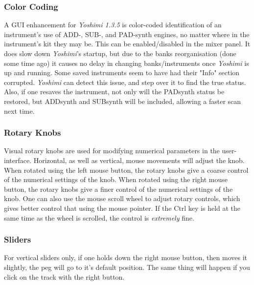 \subsubsection{Color Coding}
\label{subsubsec:stock_settings_elements_color_coding}

   A GUI enhancement for \textsl{Yoshimi 1.3.5} is color-coded identification
   of an instrument's use of ADD-, SUB-, and PAD-synth engines, no matter where
   in the instrument's kit they may be. This can be enabled/disabled in the
   mixer panel. It does slow down \textsl{Yoshimi}'s startup, but due to the
   banks reorganisation (done some time ago) it causes no delay in changing
   banks/instruments once \textsl{Yoshimi} is up and running.  Some saved
   instruments seem to have had their "Info" section corrupted.
   \textsl{Yoshimi} can detect this issue, and step over it to find the true
   status. Also, if one resaves the instrument, not only will the PADsynth
   status be restored, but ADDsynth and SUBsynth will be included, allowing a
   faster scan next time.

\subsubsection{Rotary Knobs}
\label{subsubsec:stock_settings_elements_knobs}

   Visual rotary knobs are used for modifying numerical parameters in the
   user-interface.
   Horizontal, as well as vertical, mouse movements will adjust the knob.
   When rotated using the left mouse button, the rotary knobs give a coarse
   control of the numerical settings of the knob.
   When rotated using the right mouse button, the rotary knobs give a finer
   control of the numerical settings of the knob.
   One can also use the mouse scroll wheel to adjust rotary controls, which
   gives better control that using the mouse pointer.
   If the Ctrl key is held at the same time as the wheel is scrolled, the
   control is \textsl{extremely} fine.

\subsubsection{Sliders}
\label{subsubsec:stock_settings_elements_sliders}

   For vertical sliders only, if one holds down the right mouse button, then
   moves it slightly, the peg will go to it's default position. The same
   thing will happen if you click on the track with the right button.

